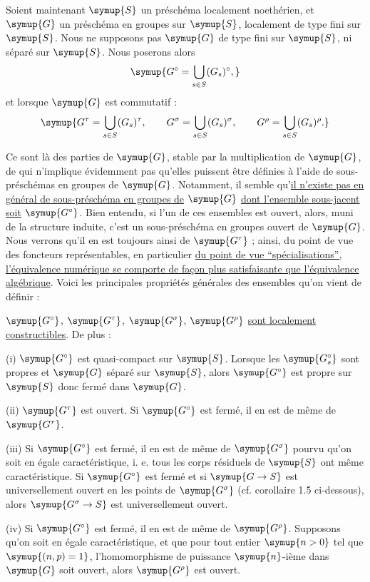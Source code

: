 Soient maintenant $\symup{S}$ un préschéma localement noethérien, et $\symup{G}$ un préschéma
en groupes sur $\symup{S}$, localement de type fini sur $\symup{S}$. Nous ne supposons pas $\symup{G}$
de type fini sur $\symup{S}$, ni séparé sur $\symup{S}$. Nous poserons alors
\[
\symup{G^\circ=\bigcup\limits_{s\in S}(G_s)^\circ,}
\]
et lorsque $\symup{G}$ est commutatif :
\[
\symup{G^\tau=\bigcup\limits_{s\in S}(G_s)^\tau,
\qquad
G^\sigma=\bigcup\limits_{s\in S}(G_s)^\sigma,
\qquad
G^\rho=\bigcup\limits_{s\in S}(G_s)^\rho.}
\]

Ce sont là des parties de $\symup{G}$, stable par la multiplication de $\symup{G}$, de qui
n'implique évidemment pas qu'elles puissent être définies à l'aide de
sous-préschémas en groupes de $\symup{G}$. Notamment, il semble qu'\uline{il n'existe pas en général de sous-préschéma en groupes de} $\symup{G}$ \uline{dont l'ensemble sous-jacent soit} $\symup{G^\circ}$. Bien entendu, si l'un de ces ensembles est ouvert, alors, muni de la
structure induite, c'est un sous-préschéma en groupes ouvert de $\symup{G}$. Nous
verrons qu'il en est toujours ainsi de $\symup{G^\tau}$ ; ainsi, du point de vue des
foncteurs représentables, en particulier \uline{du point de vue ``spécialisations'', l'équivalence numérique se comporte de façon plus satisfaisante que l'équivalence algébrique}. Voici les principales propriétés générales des
ensembles qu'on vient de définir :

 $\symup{G^\circ}$, $\symup{G^\tau}$, $\symup{G^\sigma}$, $\symup{G^\rho}$ \uline{sont localement constructibles}. De plus :

\noindent (i) $\symup{G^\circ}$ est quasi-compact sur $\symup{S}$. Lorsque les $\symup{G_s^\circ}$
sont propres et $\symup{G}$ séparé sur $\symup{S}$, alors $\symup{G^\circ}$ est propre sur $\symup{S}$ donc
fermé dans $\symup{G}$.

\noindent (ii) $\symup{G^\tau}$ est ouvert. Si $\symup{G^\circ}$ est fermé, il en est de même
de $\symup{G^\tau}$.

\noindent (iii) Si $\symup{G^\circ}$ est fermé, il en est de même de $\symup{G^\sigma}$ pourvu
qu'on soit en égale caractéristique, i. e. tous les corps résiduels de $\symup{S}$ ont
même caractéristique. Si $\symup{G^\circ}$ est fermé et si $\symup{G\to S}$ est
universellement ouvert en les points de $\symup{G^\sigma}$ (cf. corollaire 1.5
ci-dessous), alors $\symup{G^\sigma\to S}$ est universellement ouvert.

\noindent (iv) Si $\symup{G^\circ}$ est fermé, il en est de même de $\symup{G^\rho}$.
Supposons qu'on soit en égale caractéristique, et que pour tout entier $\symup{n>0}$
tel que $\symup{(n,p)=1}$, l'homomorphisme de puissance $\symup{n}$-ième dans $\symup{G}$ soit ouvert,
alors $\symup{G^\rho}$ est ouvert.

